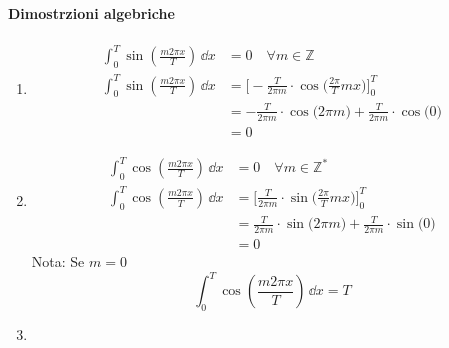 \paragraph{Dimostrzioni algebriche }
\begin{enumerate}
\item {
    \begin{align*}
        \int_0^T \sin(\frac{m2\pi x}{T})\,\dd{x} &= 0
        \quad \forall m \in \mathbb{Z} \\
        \int_0^T \sin(\frac{m2\pi x}{T})\,\dd{x}
        &= \bigg [-\frac{T}{2\pi m }\cdot\cos\big(\frac{2\pi}{T}mx\big)\bigg]^T_0 \\
        &= -\frac{T}{2\pi m}\cdot\cos\big(2\pi m\big) 
            +\frac{T}{2\pi m}\cdot\cos\big(0\big) \\
        &= 0
    \end{align*}
}

\item {
    \begin{align*}
        \int_0^T \cos(\frac{m2\pi x}{T})\,\dd{x} &= 0
        \quad \forall m \in \mathbb{Z}^* \\
        \int_0^T \cos(\frac{m2\pi x}{T})\,\dd{x}
        &= \bigg [\frac{T}{2\pi m}\cdot\sin\big(\frac{2\pi}{T}mx\big)\bigg]^T_0 \\
        &= \frac{T}{2\pi m}\cdot\sin\big(2\pi m\big) 
            +\frac{T}{2\pi m}\cdot\sin\big(0\big) \\
        &= 0
    \end{align*}
    Nota: Se \(m = 0\) 
    \[\int_0^T \cos(\frac{m2\pi x}{T})\,\dd{x} = T\]
}

\item {
}
\end{enumerate}


